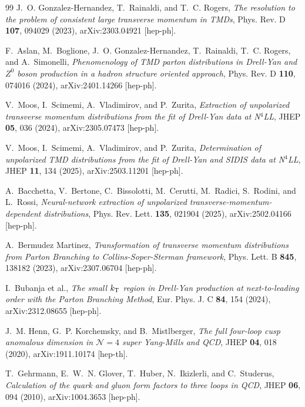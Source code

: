 \documentclass[11pt]{article}
\begin{document}
\begin{thebibliography}{99}
J.~O. Gonzalez-Hernandez, T.~Rainaldi, and T.~C. Rogers,
\textit{The resolution to the problem of consistent large transverse momentum in TMDs},
Phys. Rev. D \textbf{107}, 094029 (2023),
arXiv:2303.04921 [hep-ph].

F.~Aslan, M.~Boglione, J.~O. Gonzalez-Hernandez, T.~Rainaldi, T.~C. Rogers, and A.~Simonelli,
\textit{Phenomenology of TMD parton distributions in Drell-Yan and $Z^0$ boson production in a hadron structure oriented approach},
Phys. Rev. D \textbf{110}, 074016 (2024),
arXiv:2401.14266 [hep-ph].

V.~Moos, I.~Scimemi, A.~Vladimirov, and P.~Zurita,
\textit{Extraction of unpolarized transverse momentum distributions from the fit of Drell-Yan data at N$^4$LL},
JHEP \textbf{05}, 036 (2024),
arXiv:2305.07473 [hep-ph].

V.~Moos, I.~Scimemi, A.~Vladimirov, and P.~Zurita,
\textit{Determination of unpolarized TMD distributions from the fit of Drell-Yan and SIDIS data at N$^4$LL},
JHEP \textbf{11}, 134 (2025),
arXiv:2503.11201 [hep-ph].

A.~Bacchetta, V.~Bertone, C.~Bissolotti, M.~Cerutti, M.~Radici, S.~Rodini, and L.~Rossi,
\textit{Neural-network extraction of unpolarized transverse-momentum-dependent distributions},
Phys. Rev. Lett. \textbf{135}, 021904 (2025),
arXiv:2502.04166 [hep-ph].

A.~Bermudez Martinez,
\textit{Transformation of transverse momentum distributions from Parton Branching to Collins-Soper-Sterman framework},
Phys. Lett. B \textbf{845}, 138182 (2023),
arXiv:2307.06704 [hep-ph].

I.~Bubanja et al.,
\textit{The small $k_{\rm T}$ region in Drell-Yan production at next-to-leading order with the Parton Branching Method},
Eur. Phys. J. C \textbf{84}, 154 (2024),
arXiv:2312.08655 [hep-ph].

J.~M. Henn, G.~P. Korchemsky, and B.~Mistlberger,
\textit{The full four-loop cusp anomalous dimension in $\mathcal N=4$ super Yang-Mills and QCD},
JHEP \textbf{04}, 018 (2020),
arXiv:1911.10174 [hep-th].

T.~Gehrmann, E.~W.~N. Glover, T.~Huber, N.~Ikizlerli, and C.~Studerus,
\textit{Calculation of the quark and gluon form factors to three loops in QCD},
JHEP \textbf{06}, 094 (2010),
arXiv:1004.3653 [hep-ph].


\end{thebibliography}
\end{document}
